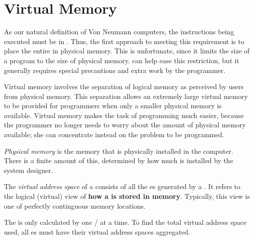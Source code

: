 \section{Virtual Memory}\label{sec:Virtual_Memory}
As our natural definition of Von Neumann computers, the instructions being executed must be in .
Thus, the first approach to meeting this requirement is to place the entire  in physical memory.
This is unfortunate, since it limits the size of a program to the size of physical memory.
 can help ease this restriction, but it generally requires special precautions and extra work by the programmer.

\begin{definition}\label{def:Virtual_Memory}
  Virtual memory involves the separation of logical memory as perceived
  by users from physical memory.
  This separation allows an extremely large virtual memory to be provided for programmers when only a smaller physical memory is available.
  Virtual memory makes the task of programming much easier, because the programmer no longer needs to worry about the amount of physical memory available; she can concentrate instead on the problem to be programmed.
\end{definition}

\begin{definition}\label{def:Physical_Memory}
  \emph{Physical memory} is the memory that is physically installed in the computer.
  There is a finite amount of this, determined by how much is installed by the system designer.
\end{definition}

\begin{definition}\label{def:Virtual_Address_Space}
  The \emph{virtual address space} of a  consists of all the es generated by a .
  It refers to the logical (virtual) view of \textbf{how a  is stored in memory}.
  Typically, this view is one of perfectly continguous memory locations.

  \begin{remark}
    The  is only calculated by one / at a time.
    To find the total virtual address space used, all es must have their virtual address spaces aggregated.
  \end{remark}
\end{definition}



